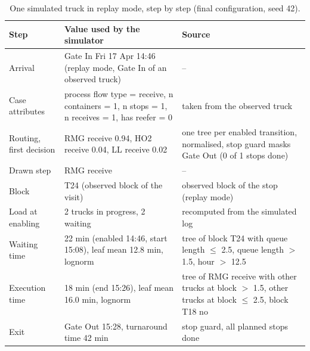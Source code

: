 \begin{table}[htbp]
\centering
\small
\begin{tabularx}{\textwidth}{L{2.3cm}YL{4.6cm}}
\toprule
\textbf{Step} & \textbf{Value used by the simulator} & \textbf{Source} \\
\midrule
Arrival & Gate In Fri 17 Apr 14:46 (replay mode, Gate In of an observed truck) & -- \\
Case attributes & process flow type = receive, n containers = 1, n stops = 1, n receives = 1, has reefer = 0 & taken from the observed truck \\
Routing, first decision & RMG receive 0.94, HO2 receive 0.04, LL receive 0.02 & one tree per enabled transition, normalised, stop guard masks Gate Out (0 of 1 stops done) \\
Drawn step & RMG receive & -- \\
Block & T24 (observed block of the visit) & observed block of the stop (replay mode) \\
Load at enabling & 2 trucks in progress, 2 waiting & recomputed from the simulated log \\
Waiting time & 22 min (enabled 14:46, start 15:08), leaf mean 12.8 min, lognorm & tree of block T24 with queue length $\leq$ 2.5, queue length $>$ 1.5, hour $>$ 12.5 \\
Execution time & 18 min (end 15:26), leaf mean 16.0 min, lognorm & tree of RMG receive with other trucks at block $>$ 1.5, other trucks at block $\leq$ 2.5, block T18 no \\
Exit & Gate Out 15:28, turnaround time 42 min & stop guard, all planned stops done \\
\bottomrule
\end{tabularx}
\par{}
\caption{One simulated truck in replay mode, step by step (final configuration, seed 42).}
\label{tab:sim_worked_example}
\end{table}
